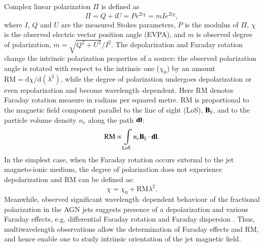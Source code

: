 \documentclass[a4paper,fleqn,usenatbib,useAMS]{mnras}
\begin{document}
Complex linear polarization $\Pi$ is defined as \begin{equation}\Pi = Q + \mathrm{i}U = Pe^{2\mathrm{i}\chi} = mIe^{2\mathrm{i}\chi},\end{equation} where $I$, $Q$ and $U$ are the measured Stokes parameters, $P$ is the modulus of $\Pi$, $\chi$ is the observed electric vector position angle (EVPA), and $m$ is observed degree of polarization, $m = \sqrt{Q^2 + U^2}/I^2$.
The depolarization and Faraday rotation change the intrinsic polarization properties of a source:
the observed polarization angle is rotated with respect to the intrinsic one ($\chi_0$) by an amount ${\mathrm{RM}} = \mathrm{d}\chi/\mathrm{d}(\lambda^2)$, while the degree of polarization undergoes depolarization or even repolarization and become wavelength--dependent.
Here RM denotes Faraday rotation measure \citep{burn66} in radians per squared metre. RM is proportional to the magnetic field component parallel to the line of sight (LoS), $\bf{B_{\parallel}}$, and to the particle volume density $n_e$ along the path $\bf{dl}$:
\begin{equation}{\mathrm{RM}} \propto \int\limits_{\mathrm{LoS}} n_e \bf{B_{\parallel}} \cdot d\bf{l}.\end{equation}
In the simplest case, when the Faraday rotation occurs external to the jet magneto-ionic medium, the degree of polarization does not experience depolarization and RM can be defined as: \begin{equation}\chi = \chi_0 + {\mathrm{RM}} \lambda ^{2}.\end{equation}
Meanwhile, observed significant wavelength--dependent behaviour of the fractional polarization in the AGN jets \citep[e.g.][]{conway_etal_74} suggests presence of a depolarization and various Faraday effects, e.g. differential Faraday rotation and Faraday dispersion \citep{sokoloff_etal98}.
Thus, multiwavelength observations allow the determination of Faraday effects and RM, and hence enable one to study intrinsic orientation of the jet magnetic field. 
\end{document}
